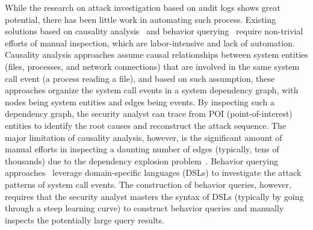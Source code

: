 While the research on attack investigation based on audit logs
shows great potential, there has been little work in automating such process.
Existing 
solutions based on causality analysis~\cite{backtracking,backtracking2,taser,intrusionrecovery,liu2018priotracker} and behavior querying~\cite{gao2018aiql,gao2018saql} require non-trivial efforts of manual inspection, 
which are labor-intensive and lack of automation.
%
Causality analysis approaches assume causal relationships between system entities (\eg files, processes, and network connections)
that are involved in the same system call event (\eg a process reading a file), and based on such assumption, these approaches organize the system call events in a system dependency graph, with nodes being system entities and edges being events.
By inspecting such a dependency graph, the security analyst can trace from POI (point-of-interest) entities to identify the root causes and reconstruct the attack sequence.
The major limitation of causality analysis, however, is the significant amount of manual efforts in inspecting a daunting number of edges (typically, tens of thousands) due to the dependency explosion problem~\cite{beep,reduction,reduction2}.
%
Behavior querying approaches~\cite{gao2018aiql,gao2018saql} leverage domain-specific languages (DSLs) to investigate the attack patterns of system call events. 
The construction of behavior queries, however, requires that the security analyst masters the syntax of DSLs (typically by going through a steep learning curve) to construct behavior queries and manually inspects the potentially large query results.



